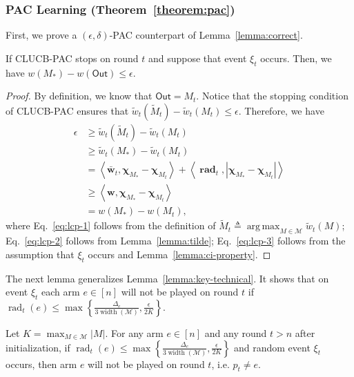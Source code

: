 \documentclass{article}
\newcommand{\AlgorithmPAC}{{\small \textsf{CLUCB-PAC}}\xspace}
\newcommand{\M}{\mathcal M}
\DeclareMathOperator{\rank}{width}
\DeclareMathOperator{\rad}{rad}
\DeclareMathOperator*{\argmax}{arg\,max}
\newcommand{\out}{\mathsf{Out}}
\newcommand{\inn}[1]{\left\langle #1 \right\rangle}
\renewcommand{\vec}[1]{\boldsymbol{#1}}
\begin{document}
\subsubsection{PAC Learning (Theorem~\ref{theorem:pac})}
First, we prove a $(\epsilon,\delta)$-PAC counterpart of Lemma~\ref{lemma:correct}.
\begin{lemma}
\label{lemma:pac-correct}
If \AlgorithmPAC stops on round $t$ and suppose that event $\xi_t$ occurs. 
Then, we have $w(M_*)-w(\out) \le \epsilon$.
\end{lemma}

\begin{proof}
By definition, we know that $\out = M_t$.
Notice that the stopping condition of \AlgorithmPAC ensures that $\tilde w_t(\tilde M_t) - \tilde w_t(M_t) \le \epsilon$.
Therefore, we have
\begin{align}
	\epsilon &\ge \tilde w_t(\tilde M_t) - \tilde w_t(M_t) \nonumber \\
           &\ge \tilde w_t(M_*) - \tilde w_t(M_t) \label{eq:lcp-1} \\
           &= \inn{\vec {\bar w}_t, \vec \chi_{M_*}-\vec\chi_{M_t}}+\inn{\vec \rad_t, |\vec \chi_{M_*}-\vec\chi_{M_t}|} \label{eq:lcp-2}\\
           &\ge \inn{\vec w, \vec \chi_{M_*}-\vec\chi_{M_t}}  \label{eq:lcp-3} \\
           &= w(M_*)-w(M_t),\nonumber
\end{align}
where Eq.~\eqref{eq:lcp-1} follows from the definition of $\tilde M_t \triangleq \argmax_{M\in \M}\tilde w_t(M)$;
Eq.~\eqref{eq:lcp-2} follows from Lemma~\ref{lemma:tilde};
Eq.~\eqref{eq:lcp-3} follows from the assumption that $\xi_t$ occurs and Lemma~\ref{lemma:ci-property}.
\end{proof}

The next lemma generalizes Lemma~\ref{lemma:key-technical}.  
It shows that on event $\xi_t$ each arm $e\in [n]$ will not be played on round $t$ if $\rad_t(e) \le \max\left\{\frac{\Delta_e}{3\rank(\M)}, \frac{\epsilon}{2K}\right\}$.
\begin{lemma}
\label{lemma:pac-key}
Let $K = \max_{M\in \M} |M|$.
For any arm $e \in [n]$ and any round $t > n$ after initialization, if $\rad_t(e) \le \max\left\{\frac{\Delta_e}{3\rank(\M)}, \frac{\epsilon}{2K}\right\}$ and random event $\xi_t$ occurs,
then arm $e$ will not be played on round $t$, i.e. $p_t\not= e$.
\end{lemma}
\end{document}
